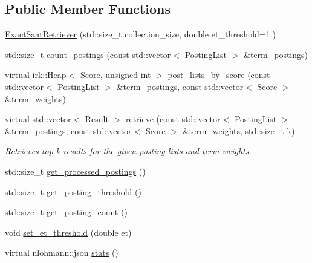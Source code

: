 \subsection*{Public Member Functions}
\begin{DoxyCompactItemize}
\item 
\mbox{\hyperlink{classbloodhound_1_1query_1_1ExactSaatRetriever_a50c5c53b4b7aff76e4eabf040219be52}{Exact\+Saat\+Retriever}} (std\+::size\+\_\+t collection\+\_\+size, double et\+\_\+threshold=1.)
\item 
std\+::size\+\_\+t \mbox{\hyperlink{classbloodhound_1_1query_1_1ExactSaatRetriever_a21f4192190392fee8d8b12b99c6bbe0e}{count\+\_\+postings}} (const std\+::vector$<$ \mbox{\hyperlink{classbloodhound_1_1PostingList}{Posting\+List}} $>$ \&term\+\_\+postings)
\item 
virtual \mbox{\hyperlink{classirk_1_1Heap}{irk\+::\+Heap}}$<$ \mbox{\hyperlink{structbloodhound_1_1Score}{Score}}, unsigned int $>$ \mbox{\hyperlink{classbloodhound_1_1query_1_1ExactSaatRetriever_aef54f0021473f9b2355b0544a5e20359}{post\+\_\+lists\+\_\+by\+\_\+score}} (const std\+::vector$<$ \mbox{\hyperlink{classbloodhound_1_1PostingList}{Posting\+List}} $>$ \&term\+\_\+postings, const std\+::vector$<$ \mbox{\hyperlink{structbloodhound_1_1Score}{Score}} $>$ \&term\+\_\+weights)
\item 
virtual std\+::vector$<$ \mbox{\hyperlink{structbloodhound_1_1query_1_1Result}{Result}} $>$ \mbox{\hyperlink{classbloodhound_1_1query_1_1ExactSaatRetriever_aced2763cc2a4c12838fef4a20759049e}{retrieve}} (const std\+::vector$<$ \mbox{\hyperlink{classbloodhound_1_1PostingList}{Posting\+List}} $>$ \&term\+\_\+postings, const std\+::vector$<$ \mbox{\hyperlink{structbloodhound_1_1Score}{Score}} $>$ \&term\+\_\+weights, std\+::size\+\_\+t k)
\begin{DoxyCompactList}\small\item\em Retrieves top-\/k results for the given posting lists and term weights. \end{DoxyCompactList}\item 
std\+::size\+\_\+t \mbox{\hyperlink{classbloodhound_1_1query_1_1ExactSaatRetriever_a1cf3c5e50a72880e1eb8d995ff22b20a}{get\+\_\+processed\+\_\+postings}} ()
\item 
std\+::size\+\_\+t \mbox{\hyperlink{classbloodhound_1_1query_1_1ExactSaatRetriever_a5d3a882f8f117130a4be46e711397e3c}{get\+\_\+posting\+\_\+threshold}} ()
\item 
std\+::size\+\_\+t \mbox{\hyperlink{classbloodhound_1_1query_1_1ExactSaatRetriever_a43b6bd8cdc3a64c5eabf778230c53419}{get\+\_\+posting\+\_\+count}} ()
\item 
void \mbox{\hyperlink{classbloodhound_1_1query_1_1ExactSaatRetriever_a78016cfffe921ed440dec62c6f82f4cc}{set\+\_\+et\+\_\+threshold}} (double et)
\item 
virtual nlohmann\+::json \mbox{\hyperlink{classbloodhound_1_1query_1_1ExactSaatRetriever_a716838f463f124964e76f48bc37d32cc}{stats}} ()
\end{DoxyCompactItemize}
